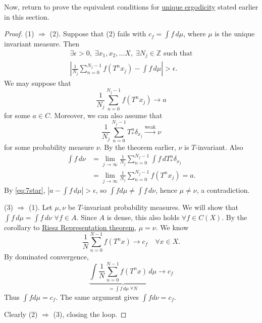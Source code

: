 \documentclass{article}
\begin{document}
Now, return to prove the equivalent conditions for \hyperlink{def:uerg}{unique ergodicity} stated earlier in this section.
\begin{proof}
  (1) $\Rightarrow$ (2). Suppose that (2) fails with $c_f = \int f \,d\mu$, where $\mu$ is the unique invariant measure.
  Then
  \begin{gather*}
    \exists \epsilon > 0,\; \exists x_1, x_2, \dotsc X,\; \exists N_j \in \mathbb{Z} \text{ such that} \\
    \left| \frac{1}{N_j} \sum_{n=0}^{N_j -1} f(T^n x_j) - \int f\,d\mu\right| > \epsilon. \tag{$*$} \label{eq:7star}
  \end{gather*}
  We may suppose that
  \begin{equation*}
    \frac{1}{N_j} \sum_{n=0}^{N_j - 1} f(T^n x_j) \to a
  \end{equation*}
  for some $a \in C$.
  Moreover, we can also assume that
  \begin{equation*}
    \frac{1}{N_j} \sum_{n=0}^{N_j - 1} T^n_* \delta_{x_j} \xrightarrow{\text{weak}} \nu
  \end{equation*}
  for some probability measure $\nu$.
  By the theorem earlier, $\nu$ is $T$-invariant. Also
  \begin{align*}
    \int f \, d\nu &= \lim_{j \to \infty} \frac{1}{N_j} \sum_{n=0}^{N_j - 1} \int f\,dT^n_* \delta_{x_j} \\
                   &= \lim_{j \to \infty} \frac{1}{N_j} \sum_{n=0}^{N_j - 1} f(T^n x_j) = a.
  \end{align*}
  By \eqref{eq:7star}, $|a - \int f\,d\mu| > \epsilon$, so $\int f d\mu \neq \int f \, d\nu$, hence $\mu \neq \nu$, a contradiction.

  (3) $\Rightarrow$ (1). Let $\mu,\nu$ be $T$-invariant probability measures.
  We will show that $\int f \, d\mu = \int f \, d\nu$ $\forall f \in A$.
  Since $A$ is dense, this also holds $\forall f \in C(X)$.
  By the corollary to \hyperlink{def:rr}{Riesz Representation theorem}, $\mu = \nu$.
  We know
  \begin{equation*}
    \frac{1}{N} \sum_{n=0}^{N-1} f(T^n x) \to c_f \quad \forall x \in X.
  \end{equation*}
  By dominated convergence,
  \begin{equation*}
    \underbrace{\int \frac{1}{N} \sum_{n=0}^{N-1} f(T^n x) \, d\mu}_{= \int f \, d\mu \; \forall N} \to c_f
  \end{equation*}
  Thus $\int f d\mu = c_f$. The same argument gives $\int f d\nu = c_f$.

  Clearly (2) $\Rightarrow$ (3), closing the loop.
\end{proof}
\end{document}
